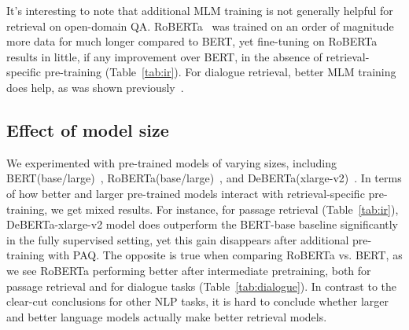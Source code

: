 \documentclass[11pt]{article}
\newcommand{\ignore}[1]{}
\begin{document}
\ignore{
\begin{figure}[ht]
    \centering
        \begin{tikzpicture}[scale=0.9\tikzscale]
        \begin{axis}[
xmode=log,
            log ticks with fixed point,
            xlabel={Training data size (millions)},
            ylabel={IR top-20 Accuracy (\%)},
            xmin=0, xmax=70,
            ymin=75, ymax=85,
            xtick={0, 1, 5, 10, 65},
            ytick={10,20,30,40,50,60,70,80,90},
            legend pos=south east,
            ymajorgrids=true,
            grid style=dashed,
        ]

        \addplot[
            color=blue,
            mark=square,
            mark size=1pt
            ]
            coordinates {
            (0.01, 78.4)(1,79.4)(5,80.7)(10,80.4)(65,81.6)
            };
            \addlegendentry{fine-tuned}

\end{axis}
        \end{tikzpicture}


    \caption{Top-20 accuracy on NQ.}
    \label{fig:ir-data-ablation}
\end{figure}
} 
It's interesting to note that additional MLM training is not generally helpful for retrieval on open-domain QA.  RoBERTa~\citep{RoBERTa} was trained on an order of magnitude more data for much longer compared to BERT, yet fine-tuning on RoBERTa results in little, if any improvement over BERT, in the absence of retrieval-specific pre-training (Table~\ref{tab:ir}).  For dialogue retrieval, better MLM training does help, as was shown previously~\citep{humeau2019poly}.

\subsection{Effect of model size}
We experimented with pre-trained models of varying sizes, including BERT(base/large)~\citep{bert}, RoBERTa(base/large)~\citep{RoBERTa}, and DeBERTa(xlarge-v2)~\citep{he2020deberta}.  In terms of how better and larger pre-trained models interact with retrieval-specific pre-training, we get mixed results.  For instance, for passage retrieval (Table~\ref{tab:ir}), DeBERTa-xlarge-v2 model does outperform the BERT-base baseline significantly in the fully supervised setting, yet this gain disappears after additional pre-training with PAQ.  The opposite is true when comparing RoBERTa vs. BERT, as we see RoBERTa performing better after intermediate pretraining, both for passage retrieval and for dialogue tasks (Table~\ref{tab:dialogue}).  In contrast to the clear-cut conclusions for other NLP tasks, it is hard to conclude whether larger and better language models actually make better retrieval models.
\end{document}
